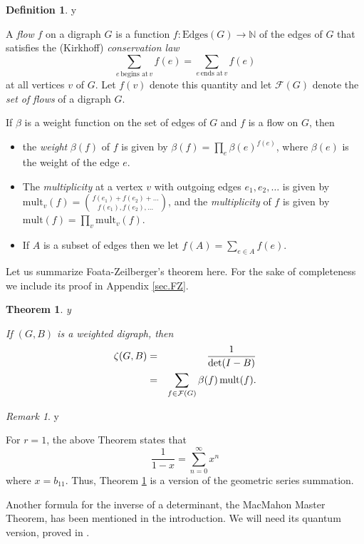 \documentclass{amsart}
\theoremstyle{plain}
\newtheorem{theorem}{Theorem}
\theoremstyle{definition}
\newtheorem{definition}[proposition]{Definition}
\theoremstyle{remark}
\newtheorem{remark}[proposition]{Remark}
\def\printname#1{
        \if\draft y
                \smash{\makebox[0pt]{\hspace{-0.5in}
                        \raisebox{8pt}{\tt\tiny #1}}}
        \fi
}
\def\lbl#1{\label{#1}\printname{#1}}
\def\BN{\mathbb N}
\def\F{\mathcal F}
\def\P{\mathcal P}
\def\b{\beta}
\def\longto{\longrightarrow}
\def\mult{\mathrm{mult}}
\def\longto{\longrightarrow}
\begin{document}
\begin{definition}
\lbl{def.flow}  
A {\em flow} $f$ on a digraph $G$ is a function $f:
\mathrm{Edges}(G)\longto \BN$
of the edges of $G$ that satisfies the (Kirkhoff) {\em conservation law}
$$
\sum_{e \, \text{begins at} \, v} f(e)=\sum_{e \, \text{ends at} \, v}
f(e)
$$
at all vertices $v$ of $G$. Let $f(v)$ denote this quantity and let $\F(G)$ 
denote the {\em set of flows} of a digraph $G$.  
\end{definition}

If $\beta$ is a weight function on
the set of edges of $G$ and $f$ is a flow on $G$, then
\begin{itemize}
\item
the {\em weight} $\b(f)$ of $f$ is given by
$\b(f)=\prod_e \b(e)^{f(e)}$, where 
$\b(e)$ is the weight of the edge $e$. 
\item
The {\em multiplicity} at a vertex $v$ with outgoing edges $e_1,e_2,\dots$ is 
given by $\mult_v(f)=\binom{f(e_1)+f(e_2)+
\dots}{f(e_1),f(e_2),\dots}$, and the {\em multiplicity} of $f$ is given by
$\mult(f)=\prod_v \mult_v(f)$. 
\item
If $A$ is a subset of edges then we let $f(A)=\sum_{e\in A} f(e)$.
\end{itemize}


Let us summarize Foata-Zeilberger's theorem \cite[Theorem 1.1]{FZ} here. For 
the sake of completeness we include its proof in Appendix \ref{sec.FZ}.

\begin{theorem}
\lbl{thm.FZ}
If $(G,B)$ is a weighted digraph, then
\begin{eqnarray}
\lbl{eq.zeta1}
\zeta(G,B) %
&=& \frac{1}{\det(I-B)} \\
\lbl{eq.zeta2}
&=& \sum_{f \in \F(G)} \b(f)\, \mult(f) .
\end{eqnarray}
\end{theorem}

\begin{remark}
\lbl{rem.comb}
For $r=1$, the above Theorem states that
$$
\frac{1}{1-x}=\sum_{n=0}^\infty x^n
$$
where $x=b_{11}$. Thus, Theorem \ref{thm.FZ} is a version of the geometric
series summation.
\end{remark}

Another formula for the inverse of a determinant, the MacMahon Master Theorem, 
has been mentioned 
in the introduction. We will need its quantum version, proved in \cite{GLZ}.
\end{document}
